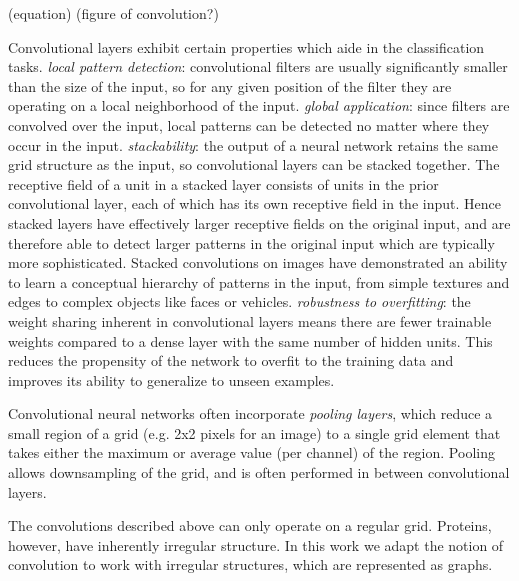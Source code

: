 (equation)
(figure of convolution?)


Convolutional layers exhibit certain properties which aide in the classification tasks.
\textit{local pattern detection}: convolutional filters are usually significantly smaller than the size of the input, so for any given position of the filter they are operating on a local neighborhood of the input. 
\textit{global application}: since filters are convolved over the input, local patterns can be detected no matter where they occur in the input.
\textit{stackability}: the output of a neural network retains the same grid structure as the input, so convolutional layers can be stacked together.
The receptive field of a unit in a stacked layer consists of units in the prior convolutional layer, each of which has its own receptive field in the input.
Hence stacked layers have effectively larger receptive fields on the original input, and are therefore able to detect larger patterns in the original input which are typically more sophisticated.
Stacked convolutions on images have demonstrated an ability to learn a conceptual hierarchy of patterns in the input, from simple textures and edges to complex objects like faces or vehicles. 
\textit{robustness to overfitting}: the weight sharing inherent in convolutional layers means there are fewer trainable weights compared to a dense layer with the same number of hidden units. 
This reduces the propensity of the network to overfit to the training data and improves its ability to generalize to unseen examples.

Convolutional neural networks often incorporate \textit{pooling layers}, which reduce a small region of a grid (e.g. 2x2 pixels for an image) to a single grid element that takes either the maximum or average value (per channel) of the region. 
Pooling allows downsampling of the grid, and is often performed in between convolutional layers. 

The convolutions described above can only operate on a regular grid. 
Proteins, however, have inherently irregular structure. 
In this work we adapt the notion of convolution to work with irregular structures, which are represented as graphs. 






